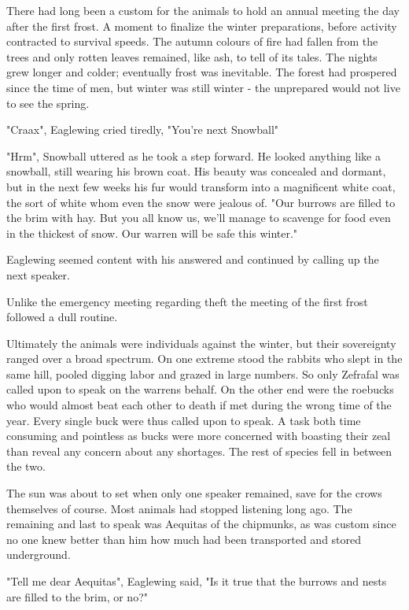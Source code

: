 \documentclass[smalldemyvopaper,11pt,twoside,onecolumn,openright,extrafontsizes]{memoir}
\begin{document}
There had long been a custom for the animals to hold an annual meeting the day after the first frost. A moment to finalize the winter preparations, before activity contracted to survival speeds. The autumn colours of fire had fallen from the trees and only rotten leaves remained, like ash, to tell of its tales. The nights grew longer and colder; eventually frost was inevitable. The forest had prospered since the time of men, but winter was still winter - the unprepared would not live to see the spring. 
 
"Craax", Eaglewing cried tiredly, "You're next Snowball"

"Hrm", Snowball uttered as he took a step forward. He looked anything like a snowball, still wearing his brown coat. His beauty was concealed and dormant, but in the next few weeks his fur would transform into a magnificent white coat, the sort of white whom even the snow were jealous of. "Our burrows are filled to the brim with hay. But you all know us, we'll manage to scavenge for food even in the thickest of snow. Our warren will be safe this winter."

Eaglewing seemed content with his answered and continued by calling up the next speaker. 

Unlike the emergency meeting regarding theft the meeting of the first frost followed a dull routine. 

Ultimately the animals were individuals against the winter, but their sovereignty ranged over a broad spectrum. On one extreme stood the rabbits who slept in the same hill, pooled digging labor and grazed in large numbers. So only Zefrafal was called upon to speak on the warrens behalf. On the other end were the roebucks who would almost beat each other to death if met during the wrong time of the year. Every single buck were thus called upon to speak. A task both time consuming and pointless as bucks were more concerned with boasting their zeal than reveal any concern about any shortages. The rest of species fell in between the two.

The sun was about to set when only one speaker remained, save for the crows themselves of course. Most animals had stopped listening long ago. The remaining and last to speak was Aequitas of the chipmunks, as was custom since no one knew better than him how much had been transported and stored underground.

"Tell me dear Aequitas", Eaglewing said, "Is it true that the burrows and nests are filled to the brim, or no?" \\
\end{document}
